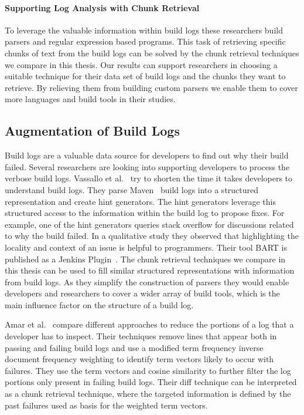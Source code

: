 \documentclass[\myrootdir/main.tex]{subfiles}
\begin{document}
\paragraph{Supporting Log Analysis with Chunk Retrieval}
To leverage the valuable information within build logs these researchers build parsers and regular expression based programs.
This task of retrieving specific chunks of text from the build logs can be solved by the chunk retrieval techniques we compare in this thesis.
Our results can support researchers in choosing a suitable technique for their data set of build logs and the chunks they want to retrieve.
By relieving them from building custom parsers we enable them to cover more languages and build tools in their studies.

\subsection{Augmentation of Build Logs}
\label{sec:rw-bl-analysis}
Build logs are a valuable data source for developers to find out why their build failed.
Several researchers are looking into supporting developers to process the verbose build logs.
Vassallo et al.~\cite{vassallo2018un-break} try to shorten the time it takes developers to understand build logs.
They parse Maven~\cite{maven2019website} build logs into a structured representation and create hint generators.
The hint generators leverage this structured access to the information within the build log to propose fixes.
For example, one of the hint generators queries stack overflow for discussions related to why the build failed.
In a qualitative study they observed that highlighting the locality and context of an issue is helpful to programmers.
Their tool BART is published as a Jenkins Plugin~\cite{bart2019plugin}.
The chunk retrieval techniques we compare in this thesis can be used to fill similar structured representations with information from build logs.
As they simplify the construction of parsers they would enable developers and researchers to cover a wider array of build tools, which is the main influence factor on the structure of a build log.

Amar et al.~\cite{amar2019mining} compare different approaches to reduce the portions of a log that a developer has to inspect.
Their techniques remove lines that appear both in passing and failing build logs and use a modified term frequency inverse document frequency weighting to identify term vectors likely to occur with failures.
They use the term vectors and cosine similarity to further filter the log portions only present in failing build logs.
Their diff technique can be interpreted as a chunk retrieval technique, where the targeted information is defined by the past failures used as basis for the weighted term vectors.
\end{document}
